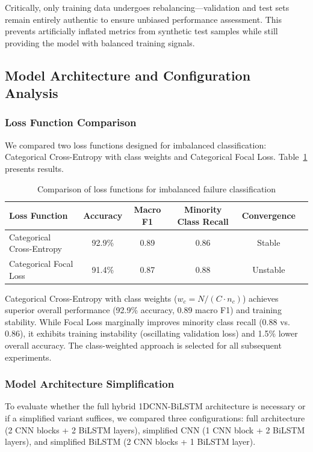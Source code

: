 \documentclass[12pt]{article}
\begin{document}
Critically, only training data undergoes rebalancing—validation and test sets remain entirely authentic to ensure unbiased performance assessment. This prevents artificially inflated metrics from synthetic test samples while still providing the model with balanced training signals.

\subsection{Model Architecture and Configuration Analysis}

\subsubsection{Loss Function Comparison}

We compared two loss functions designed for imbalanced classification: Categorical Cross-Entropy with class weights and Categorical Focal Loss. Table~\ref{tab:loss_comparison} presents results.

\begin{table}[htbp]
\centering
\caption{Comparison of loss functions for imbalanced failure classification}
\label{tab:loss_comparison}
\begin{tabular}{lccccc}
\toprule
\textbf{Loss Function} & \textbf{Accuracy} & \textbf{Macro F1} & \textbf{Minority Class Recall} & \textbf{Convergence} \\
\midrule
Categorical Cross-Entropy & 92.9\% & 0.89 & 0.86 & Stable \\
Categorical Focal Loss & 91.4\% & 0.87 & 0.88 & Unstable \\
\bottomrule
\end{tabular}
\end{table}

Categorical Cross-Entropy with class weights ($w_c = N/(C \cdot n_c)$) achieves superior overall performance (92.9\% accuracy, 0.89 macro F1) and training stability. While Focal Loss marginally improves minority class recall (0.88 vs. 0.86), it exhibits training instability (oscillating validation loss) and 1.5\% lower overall accuracy. The class-weighted approach is selected for all subsequent experiments.

\subsubsection{Model Architecture Simplification}

To evaluate whether the full hybrid 1DCNN-BiLSTM architecture is necessary or if a simplified variant suffices, we compared three configurations: full architecture (2 CNN blocks + 2 BiLSTM layers), simplified CNN (1 CNN block + 2 BiLSTM layers), and simplified BiLSTM (2 CNN blocks + 1 BiLSTM layer).
\end{document}
